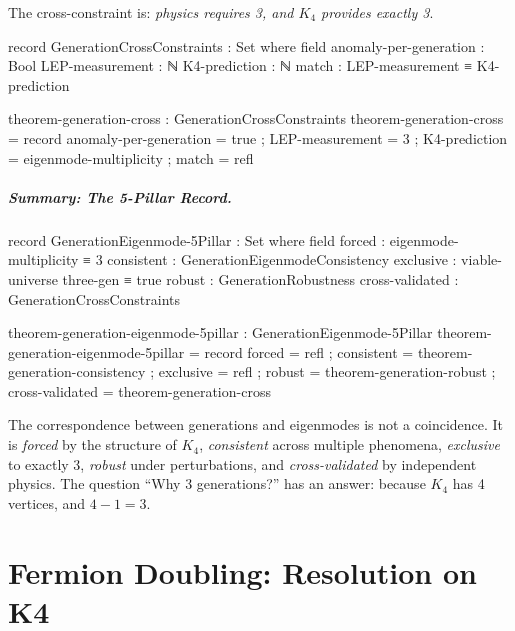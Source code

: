 \documentclass[11pt,a4paper]{book}
\def\texorpdfstring#1#2{#2}%
\begin{document}
The cross-constraint is: \emph{physics requires 3, and $K_4$ provides exactly 3}.

\begin{code}
record GenerationCrossConstraints : Set where
  field
    anomaly-per-generation : Bool
    LEP-measurement        : ℕ
    K4-prediction          : ℕ
    match                  : LEP-measurement ≡ K4-prediction

theorem-generation-cross : GenerationCrossConstraints
theorem-generation-cross = record
  { anomaly-per-generation = true
  ; LEP-measurement        = 3
  ; K4-prediction          = eigenmode-multiplicity
  ; match                  = refl
  }
\end{code}

\paragraph{Summary: The 5-Pillar Record.}

\begin{code}
record GenerationEigenmode-5Pillar : Set where
  field
    forced           : eigenmode-multiplicity ≡ 3
    consistent       : GenerationEigenmodeConsistency
    exclusive        : viable-universe three-gen ≡ true
    robust           : GenerationRobustness
    cross-validated  : GenerationCrossConstraints

theorem-generation-eigenmode-5pillar : GenerationEigenmode-5Pillar
theorem-generation-eigenmode-5pillar = record
  { forced          = refl
  ; consistent      = theorem-generation-consistency
  ; exclusive       = refl
  ; robust          = theorem-generation-robust
  ; cross-validated = theorem-generation-cross
  }
\end{code}

The correspondence between generations and eigenmodes is not a coincidence. It is \emph{forced} by the structure of $K_4$, \emph{consistent} across multiple phenomena, \emph{exclusive} to exactly 3, \emph{robust} under perturbations, and \emph{cross-validated} by independent physics. The question ``Why 3 generations?'' has an answer: because $K_4$ has 4 vertices, and $4 - 1 = 3$.

\chapter{Fermion Doubling: Resolution on \texorpdfstring{$K_4$}{K4}}
\label{chap:fermion-doubling}
\end{document}
